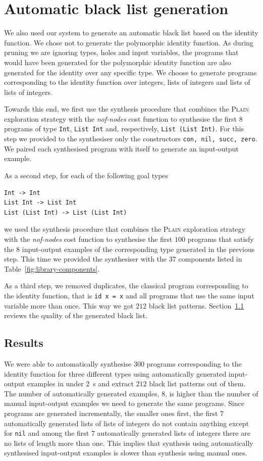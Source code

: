 \section{Automatic black list generation}\label{Black list generation}
We also used our system to generate an automatic black list based on the identity function. We chose not to generate the polymorphic identity function. As during pruning we are ignoring types, holes and input variables, the programs that would have been generated for the polymorphic identity function are also generated for the identity over any specific type. We choose to generate programs corresponding to the identity function over integers, lists of integers and lists of lists of integers.

Towards this end, we first use the synthesis procedure that combines the \textsc{Plain} exploration strategy with the \textit{nof-nodes} cost function to synthesise the first $8$ programs of type \lstinline?Int?, \lstinline?List Int? and, respectively, \lstinline?List (List Int)?. For this step we provided to the synthesiser only the constructors \lstinline?con, nil, succ, zero?. We paired each synthesised program with itself to generate an input-output example.

As a second step, for each of the following goal types
\begin{lstlisting}[style=plain]
Int -> Int
List Int -> List Int
List (List Int) -> List (List Int)
\end{lstlisting}
we used the synthesis procedure that combines the \textsc{Plain} exploration strategy with the \textit{nof-nodes} cost function to synthesise the first $100$ programs that satisfy the $8$ input-output examples of the corresponding type generated in the previous step. This time we provided the synthesiser with the $37$ components listed in Table~\ref{fig:library-components}.

As a third step, we removed duplicates, the classical program corresponding to the identity function, that is \lstinline?id x = x? and all programs that use the same input variable more than once.  This way we got $212$ black list patterns. Section~\ref{Automatic black list} reviews the quality of the generated black list.


\subsection{Results}\label{Automatic black list}
We were able to automatically synthesise $300$ programs corresponding to the identity function for three different types using automatically generated input-output examples in under \SI{2}{s} and extract $212$ black list patterns out of them.
The number of automatically generated examples, $8$, is higher than the number of manual input-output examples we need to generate the same programs. Since programs are generated incrementally, the smaller ones first, the first $7$ automatically generated lists of lists of integers do not contain anything except for \lstinline!nil! and among the first $7$ automatically generated lists of integers there are no lists of length more than one.
This implies that synthesis using automatically synthesised input-output examples is slower than synthesis using manual ones.

